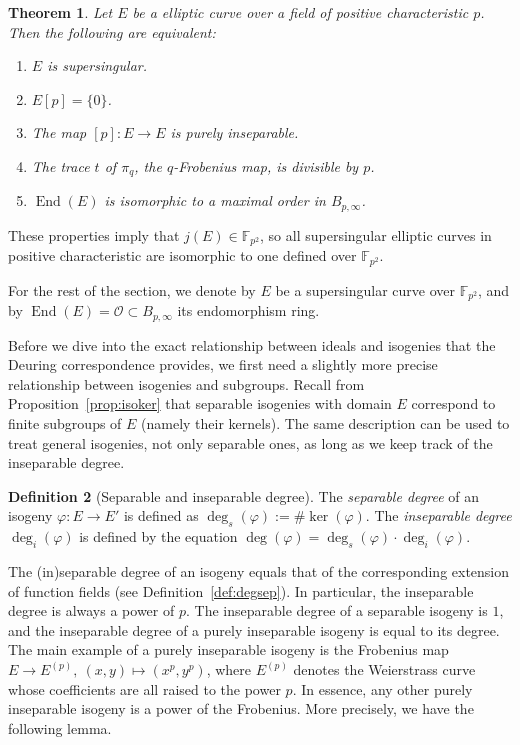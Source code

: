 \documentclass[10pt]{article}
\theoremstyle{plain}
\newtheorem{theorem}{Theorem}
\theoremstyle{definition}
\newtheorem{definition}[theorem]{Definition}
\DeclareMathOperator{\End}{End} %
\def\F{\ensuremath{\mathbb{F}}}
\def\O{\ensuremath{\mathcal{O}}}
\begin{document}
\begin{prposition}
\begin{theorem}
Let $E$ be a elliptic curve over a field of positive characteristic $p$.
Then the following are equivalent:
\begin{enumerate}
    \item $E$ is supersingular.
    \item $E[p] = \{0\}$.
    \item The map $[p]:E\to E$ is purely inseparable.
    \item The trace $t$ of $\pi_q$, the $q$-Frobenius map,
    is divisible by $p$.
    \item $\End(E)$ is isomorphic to a maximal order in $B_{p,\infty}$.
\end{enumerate}
\end{theorem}

These properties imply that $j(E)\in\F_{p^2}$, %
so all supersingular elliptic curves in positive characteristic
are isomorphic to one defined over $\F_{p^2}$.

For the rest of the section, we denote by $E$ be a supersingular
curve over $\F_{p^2}$, and by $\End(E)=\O\subset B_{p,\infty}$ its
endomorphism ring.

Before we dive into the exact relationship between ideals and isogenies
that the Deuring correspondence provides, we first need a slightly more
precise relationship between isogenies and subgroups.
Recall from Proposition~\ref{prop:isoker} that separable isogenies
with domain $E$ correspond to finite subgroups of $E$ (namely their kernels).
The same description can be used to treat general isogenies, not only
separable ones, as long as we keep track of the inseparable degree.

\begin{definition}[Separable and inseparable degree]
The \emph{separable degree} of an isogeny $\varphi:E\to E'$ is defined as
$\deg_s(\varphi):= \#\ker(\varphi)$.
The \emph{inseparable degree} $\deg_i(\varphi)$ is defined
by the equation
$\deg(\varphi) = \deg_s(\varphi) \cdot \deg_i(\varphi)$.
\end{definition}

The (in)separable degree of an isogeny equals that of 
the corresponding extension of function fields
(see Definition~\ref{def:degsep}).
In particular, the inseparable degree is always a power of $p$.
The inseparable degree of a separable isogeny is $1$,
and the inseparable degree of a purely inseparable isogeny is equal
to its degree.
The main example of a purely inseparable isogeny is the Frobenius map
$E\to E^{(p)},\:(x,y)\mapsto (x^p,y^p)$, where $E^{(p)}$ denotes the
Weierstrass curve whose coefficients are all raised to the power $p$.
In essence, any other purely inseparable isogeny is a power of the
Frobenius. More precisely, we have the following lemma.


\end{prposition}
\end{document}
